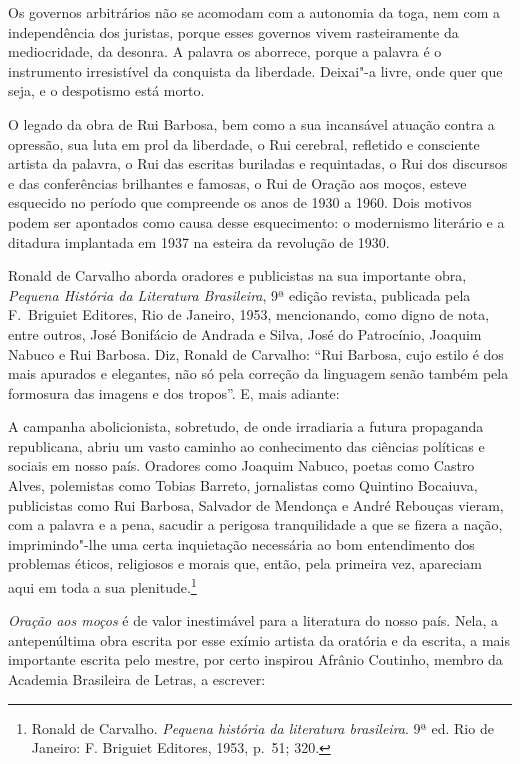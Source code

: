 \begin{hedraquote}
Os governos arbitrários não se acomodam com a autonomia da
toga, nem com a independência dos juristas, porque esses governos vivem
rasteiramente da mediocridade, da desonra. A palavra os aborrece,
porque a palavra é o instrumento irresistível da conquista da
liberdade. Deixai"-a livre, onde quer que seja, e o despotismo está morto.
\end{hedraquote}

O legado da obra de Rui Barbosa, bem como a sua incansável atuação
contra a opressão, sua luta em prol da liberdade, o Rui cerebral,
refletido e consciente artista da palavra, o Rui das escritas buriladas
e requintadas, o Rui dos discursos e das conferências brilhantes e
famosas, o Rui de Oração aos moços, esteve esquecido no período que
compreende os anos de 1930 a 1960. Dois motivos podem ser apontados
como causa desse esquecimento: o modernismo literário e a ditadura 
implantada em 1937 na esteira da revolução de 1930.

Ronald de Carvalho aborda oradores e publicistas na sua importante obra,
\textit{Pequena História da Literatura Brasileira}, 9ª edição revista, publicada
pela F.~Briguiet Editores, Rio de Janeiro, 1953, mencionando, como
digno de nota, entre outros, José Bonifácio de Andrada e Silva, José do
Patrocínio, Joaquim Nabuco e Rui Barbosa. Diz, Ronald de Carvalho: “Rui
Barbosa, cujo estilo é dos mais apurados e elegantes, não só pela
correção da linguagem senão também pela formosura das imagens e dos
tropos”. E, mais adiante: 

\begin{hedraquote}
A campanha abolicionista,
sobretudo, de onde irradiaria a futura propaganda republicana, abriu um
vasto caminho ao conhecimento das ciências políticas e sociais em nosso
país. Oradores como Joaquim Nabuco, poetas como Castro Alves,
polemistas como Tobias Barreto, jornalistas como Quintino Bocaiuva,
publicistas como Rui Barbosa, Salvador de Mendonça e André Rebouças
vieram, com a palavra e a pena, sacudir a perigosa tranquilidade a que
se fizera a nação, imprimindo"-lhe uma certa inquietação necessária ao
bom entendimento dos problemas éticos, religiosos e morais que, então,
pela primeira vez, apareciam aqui em toda a sua plenitude.\footnote{Ronald de 
Carvalho. \textit{Pequena história da literatura brasileira}. 9ª ed. 
Rio de Janeiro: F. Briguiet Editores, 1953, p.~51; 320.}
\end{hedraquote}

\textit{Oração aos moços} é de valor inestimável para a literatura
do nosso país. Nela, a antepenúltima obra escrita por esse exímio
artista da oratória e da escrita, a mais importante escrita pelo
mestre, por certo inspirou Afrânio Coutinho, membro da Academia 
Brasileira de Letras, a escrever: 

